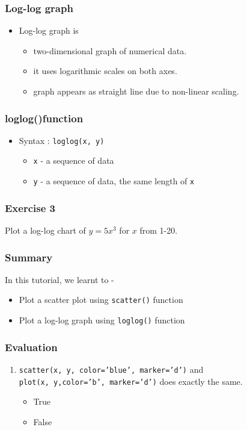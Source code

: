 \documentclass[17pt]{beamer}
\newcounter{saveenumi}
\newcommand{\seti}{\setcounter{saveenumi}{\value{enumi}}}
\begin{document}
\begin{frame}
\frametitle{Log-log graph}
\label{sec-16}
\begin{itemize}
\item Log-log graph is
\begin{itemize}
\item two-dimensional graph of numerical data.\pause
\item it uses logarithmic scales on both axes.\pause
\item graph appears as straight line due to non-linear scaling.
\end{itemize}
\end{itemize}
\end{frame}

\begin{frame}[fragile]
\frametitle{loglog()function}
\label{sec-18}
\begin{itemize}
\item Syntax : \texttt{loglog(x, y)}\pause
\begin{itemize}
\item \texttt{x} - a sequence of data\pause
\item \texttt{y} - a sequence of data, the same length of \texttt{x}
\end{itemize}
\end{itemize}
\end{frame}
\begin{frame}
\frametitle{Exercise 3}
Plot a log-log chart of $y = 5x^3$ for $x$ from 1-20.
\end{frame}
\begin{frame}
\frametitle{Summary}
\label{sec-20}
In this tutorial, we learnt to -\pause
\begin{itemize}
\item Plot a scatter plot using \texttt{scatter()} function\pause
\item Plot a log-log graph using \texttt{loglog()} function
\end{itemize}
\end{frame}
\begin{frame}
\frametitle{Evaluation}
\begin{enumerate}
\item \texttt{scatter(x, y, color='blue', marker='d')} 
and \\
\texttt{plot(x, y,color='b', marker='d')} does exactly the same.
\begin{itemize}
	\item True
	\item False
\end{itemize}
\seti
\end{enumerate}
\end{frame}
\end{document}
